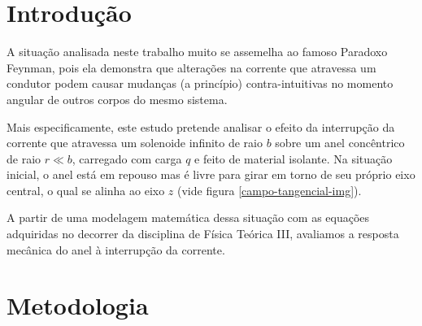 \documentclass[
	article,
	11pt,
	oneside,
	a4paper,
	english,
	brazil,
	sumario=tradicional
	]{abntex2}
\begin{document}
\frenchspacing


\textual
\section{Introdução}

A situação analisada neste trabalho muito se assemelha ao famoso Paradoxo Feynman, pois ela demonstra que alterações na corrente que atravessa um condutor podem causar mudanças (a princípio) contra-intuitivas no momento angular de outros corpos do mesmo sistema.

Mais especificamente, este estudo pretende analisar o efeito da interrupção da corrente que atravessa um solenoide infinito de raio $b$ sobre um anel concêntrico de raio $r \ll b$, carregado com carga $q$ e feito de material isolante. Na situação inicial, o anel está em repouso mas é livre para girar em torno de seu próprio eixo central, o qual se alinha ao eixo $z$ (vide figura \ref{campo-tangencial-img}).

A partir de uma modelagem matemática dessa situação com as equações adquiridas no decorrer da disciplina de Física Teórica III, avaliamos a resposta mecânica do anel à interrupção da corrente.

\section{Metodologia}
\end{document}
